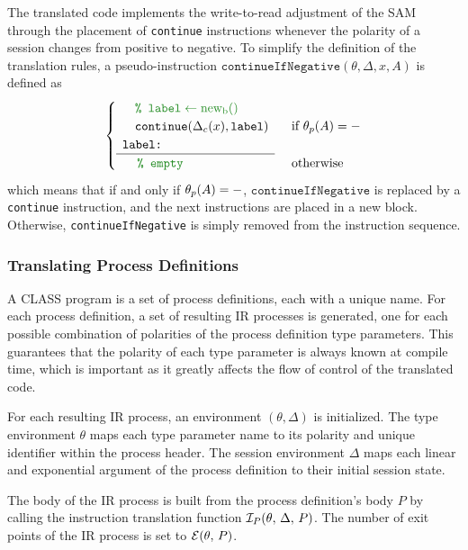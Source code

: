 \documentclass[sigconf,nonacm,natbib=true]{acmart}
\begin{document}
The translated code implements the write-to-read adjustment of the \ac{SAM} through the placement of \texttt{continue} instructions whenever the polarity of a session changes from positive to negative. To simplify the definition of the translation rules, a pseudo-instruction $\texttt{continueIfNegative}(\theta, \Delta, x, A)$ is defined as
\[\begin{cases}
    \begin{array}{l}
        \quad\textcolor{forestgreen}{\texttt{\% }\makeblock{\texttt{label}}} \\
        \quad\texttt{continue}(\continuationof{\Delta}{x}, \texttt{label}) \\
        \texttt{label:} \\
        \hline
    \end{array} & \text{ if } \polarityof{\theta}{A} = -\\
    \quad\ \ \textcolor{forestgreen}{\texttt{\%\ empty}} & \text{ otherwise}\\
\end{cases}\]
which means that if and only if $\theta_{p}(A) = -$, $\texttt{continueIfNegative}$ is replaced by a \texttt{continue} instruction, and the next instructions are placed in a new block. Otherwise, \texttt{continueIfNegative} is simply removed from the instruction sequence.

\subsubsection{Translating Process Definitions} A \ac{CLASS} program is a set of process definitions, each with a unique name. For each process definition, a set of resulting \ac{IR} processes is generated, one for each possible combination of polarities of the process definition type parameters. This guarantees that the polarity of each type parameter is always known at compile time, which is important as it greatly affects the flow of control of the translated code.

For each resulting \ac{IR} process, an environment $(\theta, \Delta)$ is initialized. The type environment $\theta$ maps each type parameter name to its polarity and unique identifier within the process header. The session environment $\Delta$ maps each linear and exponential argument of the process definition to their initial session state.

The body of the \ac{IR} process is built from the process definition's body $P$ by calling the instruction translation function $\mathcal{I}_P(\theta,\,\Delta,\,P)$. The number of exit points of the \ac{IR} process is set to $\mathcal{E}(\theta,\,P)$.
\end{document}

